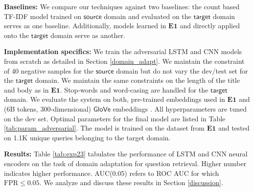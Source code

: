 \documentclass{sigkddExp}
\begin{document}
\textbf{Baselines:} We compare our techniques against two baselines: the count based TF-IDF model trained on $\textsf{source}$ domain and evaluated on the $\textsf{target}$ domain serves as one baseline. Additionally, models learned in $\mathbf{E1}$ and directly applied onto the $\textsf{target}$ domain serve as another.

\textbf{Implementation specifics:} We train the adversarial LSTM and CNN models from scratch as detailed in Section \ref{domain_adapt}. We maintain the constraint of 40 negative samples for the $\mathsf{source}$ domain but do not vary the dev/test set for the $\mathsf{target}$ domain. We maintain the same constraints on the length of the title and body as in $\mathbf{E1}$. Stop-words and word-casing are handled for the $\mathsf{target}$ domain. We evaluate the system on both, pre-trained embeddings used in $\mathbf{E1}$ and (6B tokens, 300-dimensional) $\mathsf{GloVe}$ embeddings \cite{pennington2014glove}. All hyperparameters are tuned on the dev set. Optimal parameters for the final model are listed in Table \ref{tab:param_adversarial}. The model is trained on the dataset from $\mathbf{E1}$ and tested on 1.1K unique queries belonging to the \textsf{target} domain.

\textbf{Results:} Table \ref{tab:exp23} tabulates the performance of LSTM and CNN neural encoders on the task of domain adaptation for question retrieval. Higher number indicates higher performance. AUC(0.05) refers to ROC AUC for which $\mathrm{FPR} \leq 0.05$. We analyze and discuss these results in Section \ref{discussion}.
\end{document}
